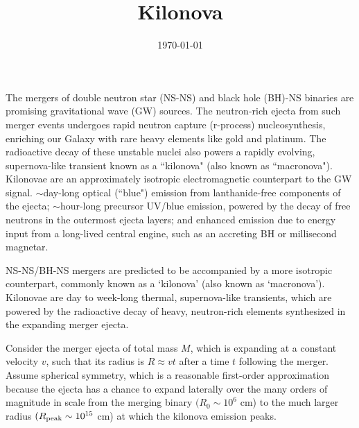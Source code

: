 \documentclass[11pt,a4paper]{article}
\title{Kilonova}
\author{}
\date{\today}
\begin{document}
\maketitle

\cite{2017LRR....20....3M} The mergers of double neutron star (NS-NS) and black hole (BH)-NS binaries are promising gravitational wave (GW) sources. The neutron-rich ejecta from such merger events undergoes rapid neutron capture (r-process) nucleosynthesis, enriching our Galaxy with rare heavy elements like gold and platinum. The radioactive decay of these unstable nuclei also powers a rapidly evolving, supernova-like transient known as a ``kilonova" (also known as ``macronova"). Kilonovae are an approximately isotropic electromagnetic counterpart to the GW signal.  $\sim$day-long optical (``blue") emission from lanthanide-free components of the ejecta; $\sim$hour-long precursor UV/blue emission, powered by the decay of free neutrons in the outermost ejecta layers; and enhanced emission due to energy input from a long-lived central engine, such as an accreting BH or millisecond magnetar.


NS-NS/BH-NS mergers are predicted to be accompanied by a more isotropic counterpart, commonly known as a `kilonova' (also known as `macronova'). Kilonovae are day to week-long thermal, supernova-like transients, which are powered by the radioactive decay of heavy, neutron-rich elements synthesized in the expanding merger ejecta. 


Consider the merger ejecta of total mass $M$, which is expanding at a constant velocity $v$, such that its radius is $R \approx vt$ after a time $t$ following the merger. Assume spherical symmetry, which is a reasonable first-order approximation because the ejecta has a chance to expand laterally over the many orders of magnitude in scale from the merging binary $(R_0 \sim 10^6$ cm) to the much larger radius $(R_{\rm peak} \sim 10^{15}$ cm) at which the kilonova emission peaks.
\end{document}
